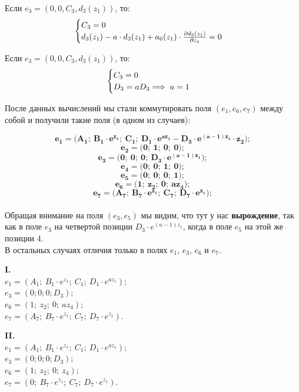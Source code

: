 \documentclass[12pt]{article}
\begin{document}
Если $e_3 = (0, 0, C_3, d_3(z_1))$, то:
\begin{equation*}
 \begin{cases}
   $$C_3 = 0$$ \\
   $$d_3(z_1) - a \cdot d_3(z_1) + a_6(z_1) \cdot \frac{\partial d_3(z_1) }{\partial z_1} = 0$$
 \end{cases}
\end{equation*}

Если $e_3 = (0, 0, C_3, d_3(z_1))$, то:
\begin{equation*}
 \begin{cases}
   $$C_3 = 0$$ \\
   $$D_3 = aD_3$$ \implies a = 1
 \end{cases}
\end{equation*}

После данных вычислений мы стали коммутировать поля $(e_1, e_6, e_7)$ между собой и получили такие поля (в одном из случаев):


\[
\boldsymbol{e_1 = \big( A_1;\ B_1 \cdot e^{z_1};\ C_1;\ D_1 \cdot e^{az_1} - D_3 \cdot e^{(a - 1)z_1} \cdot z_2 \big);}
\]
\[
\boldsymbol{e_2 = \big( 0;\ 1;\ 0;\ 0\big);}
\]
\[
\boldsymbol{e_3 = \big( 0;\ 0;\ 0;\ D_3 \cdot e^{(a - 1)z_1} \big);}
\]
\[
\boldsymbol{e_4 = \big( 0;\ 0;\ 1;\ 0 \big);}
\]
\[
\boldsymbol{e_5 = \big( 0;\ 0;\ 0;\ 1 \big);}
\]
\[
\boldsymbol{e_6 = \big( 1;\ z_2;\ 0;\ az_4 \big);}
\]
\[
\boldsymbol{e_7 = \big( A_7;\ B_7 \cdot e^{z_1};\ C_7;\ D_7 \cdot e^{z_1} \big);}
\]\\
Обращая внимание на поля $(e_3, e_5)$ мы видим, что тут у нас \textbf{вырождение}, так как в поле $e_3$ на четвертой позиции $D_3 \cdot e^{(a - 1)z_1}$, когда в поле $e_5$ на этой же позиции 4.\\

В остальных случаях отличия только в полях $e_1$, $e_3$, $e_6$ и $e_7$.\\

\begin{minipage}[t]{0.45\textwidth}
\textbf{I.}\\
$e_1 = (A_1;\ B_1 \cdot e^{z_1};\ C_1;\ D_1 \cdot e^{az_1})$;\\
$e_3 = (0; 0; 0; D_3)$;\\
$e_6 = (1;\ z_2;\ 0;\ az_4)$;\\
$e_7 = (A_7;\ B_7 \cdot e^{z_1};\ C_7;\ D_7 \cdot e^{z_1})$.\\
\end{minipage}%
\hfill
\begin{minipage}[t]{0.45\textwidth}
\textbf{II.}\\
$e_1 = (A_1;\ B_1 \cdot e^{z_1};\ C_1;\ D_1 \cdot e^{az_1})$;\\
$e_3 = (0; 0; 0; D_3)$;\\
$e_6 = (1;\ z_2;\ 0;\ z_4)$;\\
$e_7 = (0;\ B_7 \cdot e^{z_1};\ C_7;\ D_7 \cdot e^{z_1})$.\\
\end{minipage}
\end{document}
